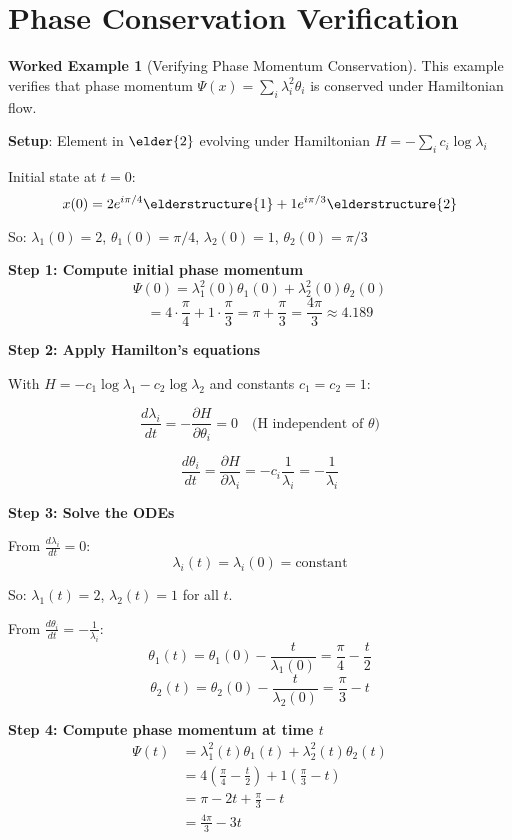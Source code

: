 \documentclass[12pt,a4paper]{article}
\theoremstyle{definition}
\newtheorem{example}{Worked Example}[section]
\theoremstyle{remark}
\begin{document}
\newpage
\section{Phase Conservation Verification}

\begin{example}[Verifying Phase Momentum Conservation]
This example verifies that phase momentum $\Psi(x) = \sum_i \lambda_i^2 \theta_i$ is conserved under Hamiltonian flow.

\textbf{Setup}: Element in $\elder{2}$ evolving under Hamiltonian $H = -\sum_i c_i \log \lambda_i$

Initial state at $t=0$:
$$x(0) = 2e^{i\pi/4} \elderstructure{1} + 1e^{i\pi/3} \elderstructure{2}$$

So: $\lambda_1(0) = 2$, $\theta_1(0) = \pi/4$, $\lambda_2(0) = 1$, $\theta_2(0) = \pi/3$

\textbf{Step 1: Compute initial phase momentum}
$$\Psi(0) = \lambda_1^2(0) \theta_1(0) + \lambda_2^2(0) \theta_2(0)$$
$$= 4 \cdot \frac{\pi}{4} + 1 \cdot \frac{\pi}{3} = \pi + \frac{\pi}{3} = \frac{4\pi}{3} \approx 4.189$$

\textbf{Step 2: Apply Hamilton's equations}

With $H = -c_1 \log \lambda_1 - c_2 \log \lambda_2$ and constants $c_1 = c_2 = 1$:

$$\frac{d\lambda_i}{dt} = -\frac{\partial H}{\partial \theta_i} = 0 \quad \text{(H independent of $\theta$)}$$

$$\frac{d\theta_i}{dt} = \frac{\partial H}{\partial \lambda_i} = -c_i \frac{1}{\lambda_i} = -\frac{1}{\lambda_i}$$

\textbf{Step 3: Solve the ODEs}

From $\frac{d\lambda_i}{dt} = 0$: 
$$\lambda_i(t) = \lambda_i(0) = \text{constant}$$

So: $\lambda_1(t) = 2$, $\lambda_2(t) = 1$ for all $t$.

From $\frac{d\theta_i}{dt} = -\frac{1}{\lambda_i}$:
$$\theta_1(t) = \theta_1(0) - \frac{t}{\lambda_1(0)} = \frac{\pi}{4} - \frac{t}{2}$$
$$\theta_2(t) = \theta_2(0) - \frac{t}{\lambda_2(0)} = \frac{\pi}{3} - t$$

\textbf{Step 4: Compute phase momentum at time $t$}
\begin{align}
\Psi(t) &= \lambda_1^2(t) \theta_1(t) + \lambda_2^2(t) \theta_2(t) \\
&= 4 \left(\frac{\pi}{4} - \frac{t}{2}\right) + 1 \left(\frac{\pi}{3} - t\right) \\
&= \pi - 2t + \frac{\pi}{3} - t \\
&= \frac{4\pi}{3} - 3t
\end{align}


\end{example}
\end{document}
